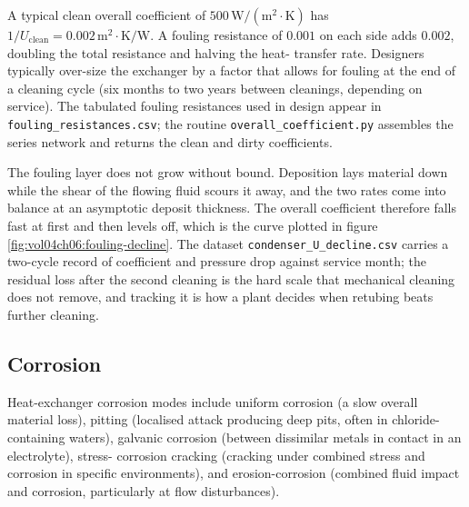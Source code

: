 

A typical clean overall coefficient of $500\,\text{W}/(\text{m}^2
\cdot\si{\kelvin})$ has $1/U_{\text{clean}} = 0.002\,\text{m}^2\cdot
\si{\kelvin}/\text{W}$. A fouling resistance of $0.001$ on each side
adds $0.002$, doubling the total resistance and halving the heat-
transfer rate. Designers typically over-size the exchanger by a
factor that allows for fouling at the end of a cleaning cycle (six
months to two years between cleanings, depending on service). The
tabulated fouling resistances used in design appear in
\texttt{fouling\_resistances.csv}; the routine
\texttt{overall\_coefficient.py} assembles the series network and
returns the clean and dirty coefficients.



The fouling layer does not grow without bound. Deposition lays material
down while the shear of the flowing fluid scours it away, and the two
rates come into balance at an asymptotic deposit thickness. The
overall coefficient therefore falls fast at first and then levels off,
which is the curve plotted in figure
\ref{fig:vol04ch06:fouling-decline}. The dataset
\texttt{condenser\_U\_decline.csv} carries a two-cycle record of
coefficient and pressure drop against service month; the residual loss
after the second cleaning is the hard scale that mechanical cleaning
does not remove, and tracking it is how a plant decides when retubing
beats further cleaning.

\subsection{Corrosion}

Heat-exchanger corrosion modes include uniform corrosion (a slow
overall material loss), pitting (localised attack producing deep
pits, often in chloride-containing waters), galvanic corrosion
(between dissimilar metals in contact in an electrolyte), stress-
corrosion cracking (cracking under combined stress and corrosion in
specific environments), and erosion-corrosion (combined fluid impact
and corrosion, particularly at flow disturbances).

